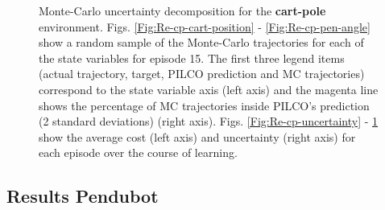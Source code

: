 \begin{figure}[htp!]
\begin{subfigure}[b]{0.48\linewidth}
    \label{Fig:Re-cp-uncertainty-norm} 
  \end{subfigure} 
\caption[Monte-Carlo uncertainty decomposition for for \textbf{cart-pole} environment]{Monte-Carlo uncertainty decomposition for the \textbf{cart-pole} environment. Figs. \ref{Fig:Re-cp-cart-position} - \ref{Fig:Re-cp-pen-angle} show a random sample of the Monte-Carlo trajectories for each of the state variables for episode 15. The first three legend items (actual trajectory, target, PILCO prediction and MC trajectories) correspond to the state variable axis (left axis) and the magenta line shows the percentage of MC trajectories inside PILCO's prediction (2 standard deviations) (right axis).  Figs. \ref{Fig:Re-cp-uncertainty} - \ref{Fig:Re-cp-uncertainty-norm} show the average cost (left axis) and uncertainty (right axis) for each episode over the course of learning.}
\label{Fig:Re-Cart-Pole-Full-Results} 
\end{figure}

\subsection{Results Pendubot}

